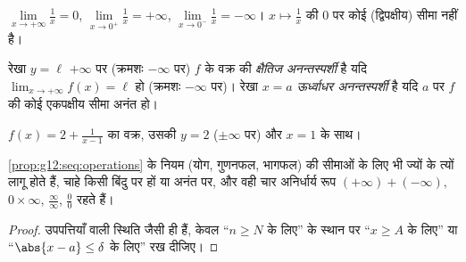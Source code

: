 \begin{example}
$\lim\limits_{x\to+\infty} \frac{1}{x} = 0$, $\lim\limits_{x\to 0^+} \frac{1}{x} = +\infty$, $\lim\limits_{x\to 0^-} \frac{1}{x} = -\infty$।  $x \mapsto \frac1x$ की $0$ पर कोई (द्विपक्षीय) सीमा नहीं है।
\end{example}

\begin{definition}[अनन्तस्पर्शी]\label{def:g12:limcont:asymptote}
रेखा $y = \ell$ $+\infty$ पर (क्रमशः $-\infty$ पर) $f$ के वक्र की \emph{क्षैतिज
अनन्तस्पर्शी} है यदि $\lim_{x\to+\infty} f(x) = \ell$ हो (क्रमशः $-\infty$ पर)। रेखा $x = a$
\emph{ऊर्ध्वाधर अनन्तस्पर्शी} है यदि $a$ पर $f$ की कोई
एकपक्षीय सीमा अनंत हो।
\end{definition}

\begin{omfigure}

{\small $f(x) = 2 + \frac{1}{x-1}$ का वक्र, उसकी  $y = 2$ ($\pm\infty$ पर) और  $x = 1$ के साथ।}
\end{omfigure}

\begin{proposition}[सीमाओं पर संक्रियाएँ]\label{prop:g12:limcont:operations}
\cref{prop:g12:seq:operations} के नियम (योग, गुणनफल, भागफल)  की सीमाओं के लिए भी ज्यों के त्यों
लागू होते हैं, चाहे किसी बिंदु पर हों या अनंत पर, और वही चार अनिर्धार्य रूप
$(+\infty)+(-\infty)$, $0\times\infty$, $\frac{\infty}{\infty}$, $\frac{0}{0}$ रहते हैं।
\end{proposition}

\begin{proof}
उपपत्तियाँ  वाली स्थिति जैसी ही हैं, केवल ``$n \geq N$ के लिए'' के स्थान
पर ``$x \geq A$ के लिए'' या ``$\abs{x-a} \leq \delta$ के लिए'' रख दीजिए।
\end{proof}

